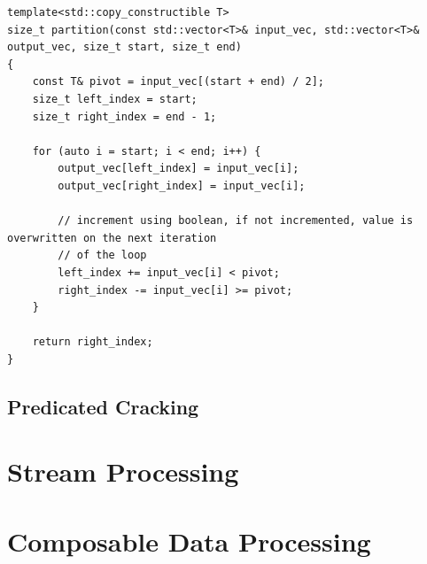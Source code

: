 \begin{verbatim}
template<std::copy_constructible T>
size_t partition(const std::vector<T>& input_vec, std::vector<T>& output_vec, size_t start, size_t end)
{
    const T& pivot = input_vec[(start + end) / 2];  
    size_t left_index = start;
    size_t right_index = end - 1;

    for (auto i = start; i < end; i++) {
        output_vec[left_index] = input_vec[i];
        output_vec[right_index] = input_vec[i];

        // increment using boolean, if not incremented, value is overwritten on the next iteration 
        // of the loop 
        left_index += input_vec[i] < pivot;
        right_index -= input_vec[i] >= pivot;
    }

    return right_index;
}
\end{verbatim}

\subsection{Predicated Cracking}



\section{Stream Processing}
\section{Composable Data Processing}

